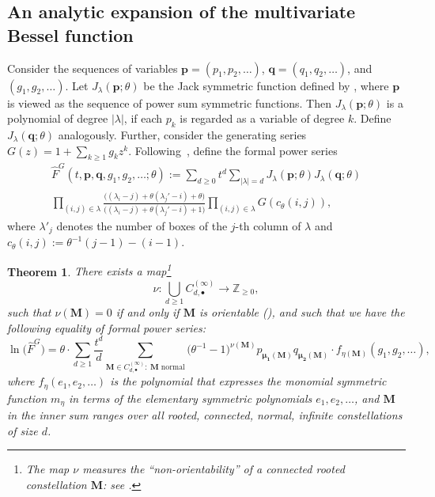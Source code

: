 \documentclass[11pt]{article}
\theoremstyle{plain}
\newtheorem{theorem}[lemma]{Theorem}
\newcommand{\Z}{\mathbb Z}
\newcommand{\la}{\lambda}
\newcommand{\MM}{\mathbf M}
\newcommand{\bfp}{\mathbf{p}}
\newcommand{\bfq}{\mathbf{q}}
\begin{document}
\subsection{An analytic expansion of the multivariate Bessel function}\label{sec:CD_bessel}


Consider the sequences of variables $\bfp=(p_1,p_2,\dots)$, $\bfq=(q_1,q_2,\dots)$, and $(g_1,g_2,\dots)$.
Let $J_\la(\bfp;\theta)$ be the Jack symmetric function defined by \cite[Ch.~VI.10, Eqn.~(10.13)]{M}, where $\bfp$ is viewed as the sequence of power sum symmetric functions.
Then $J_\la(\bfp;\theta)$ is a polynomial of degree $|\la|$, if each $p_k$ is regarded as a variable of degree $k$.
Define $J_\la(\bfq;\theta)$ analogously.
Further, consider the generating series $G(z)=1+\sum_{k\ge 1}g_{k}z^{k}$.
Following~\cite{CD}, define the formal power series
\begin{multline}\label{eq_Fhat}
\hat{F}^G(t,\bfp,\bfq,g_1,g_2,\dots;\theta) := \sum_{d\ge 0} t^d\sum_{|\la|=d} J_\la(\bfp;\theta)J_\la(\bfq;\theta)\\
\prod_{(i,j)\in\la}\frac{\big((\la_i-j)+\theta(\la_j'-i)+\theta\big)}{\big((\la_i-j)+\theta(\la_j'-i)+1\big)} \prod_{(i,j)\in \la}G(c_\theta(i,j)),
\end{multline}
where $\la'_j$ denotes the number of boxes of the $j$-th column of $\la$ and $c_\theta(i,j) := \theta^{-1}(j-1)-(i-1)$.

\begin{theorem}\cite[Theorem 6.2]{CD}\label{thm:CDmaintheorem}
There exists a map\footnote{The map $\nu$ measures the ``non-orientability'' of a connected rooted constellation $\MM$: see \cite[Section 3]{CD}.} \[
    \nu\colon\bigcup_{d\ge 1} C_{d,\bullet}^{(\infty)}\to\Z_{\ge 0},
    \]
    such that $\nu(\MM)=0$ if and only if $\MM$ is orientable (\cite[Definition-Lemma 3.8]{CD}), and such that we have the following equality of formal power series:
    \begin{equation}
        \ln\Big(\hat{F}^{G}\Big) =
        \theta\cdot\sum_{d\ge 1} \frac{t^d}{d} \sum_{\MM\in C^{(\infty)}_{d,\bullet}: \ \MM \text{ normal}}\big(\theta^{-1}-1\big)^{\nu(\MM)}
        p_{\pmb{\mu_1}(\MM)}
        q_{\pmb{\mu_2}(\MM)}\cdot
        f_{\eta(\MM)}\left(g_1,g_2,\dots\right),
    \end{equation}
    where $f_{\eta}(e_1,e_2,\dots)$ is the polynomial that expresses the monomial symmetric function $m_{\eta}$ in terms of the elementary symmetric polynomials $e_1,e_2,\dots$, and $\MM$ in the inner sum ranges over all rooted, connected, normal, infinite constellations of size $d$.
\end{theorem}
\end{document}
